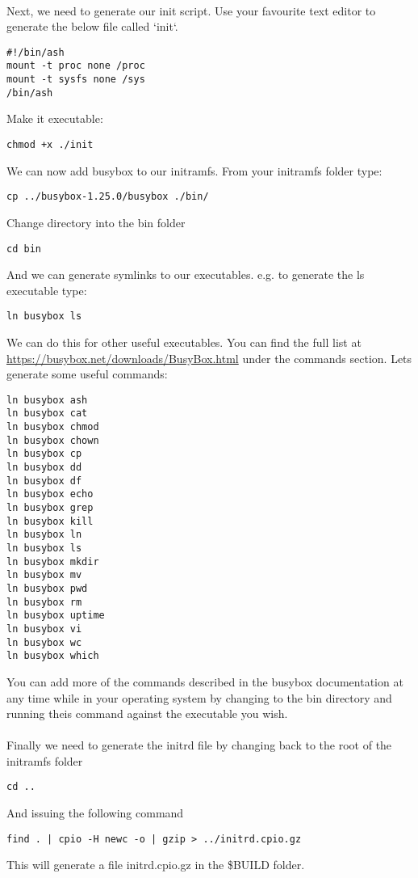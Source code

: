 \documentclass[twocolumn]{article}
\begin{document}
\\
Next, we need to generate our init script. Use your favourite text editor to generate the below file called `init`.
\begin{lstlisting}
#!/bin/ash
mount -t proc none /proc
mount -t sysfs none /sys
/bin/ash
\end{lstlisting}
Make it executable:
\begin{lstlisting}
chmod +x ./init
\end{lstlisting}
We can now add busybox to our initramfs. From your initramfs folder type:
\begin{lstlisting}
cp ../busybox-1.25.0/busybox ./bin/
\end{lstlisting}
Change directory into the bin folder
\begin{lstlisting}
cd bin
\end{lstlisting}
And we can generate symlinks to our executables. e.g. to generate the ls executable type:
\begin{lstlisting}
ln busybox ls
\end{lstlisting}
We can do this for other useful executables. You can find the full list at \url{https://busybox.net/downloads/BusyBox.html} under the commands section. Lets generate some useful commands:
\begin{lstlisting}
ln busybox ash
ln busybox cat
ln busybox chmod
ln busybox chown
ln busybox cp
ln busybox dd
ln busybox df
ln busybox echo
ln busybox grep
ln busybox kill
ln busybox ln
ln busybox ls
ln busybox mkdir
ln busybox mv
ln busybox pwd
ln busybox rm
ln busybox uptime
ln busybox vi
ln busybox wc
ln busybox which
\end{lstlisting}
You can add more of the commands described in the busybox documentation at any time while in your operating system by changing to the bin directory and running theis command against the executable you wish.\\
\\
Finally we need to generate the initrd file by changing back to the root of the initramfs folder
\begin{lstlisting}
cd ..
\end{lstlisting}
And issuing the following command
\begin{lstlisting}
find . | cpio -H newc -o | gzip > ../initrd.cpio.gz
\end{lstlisting}
This will generate a file initrd.cpio.gz in the \$BUILD folder. 
\end{document}
